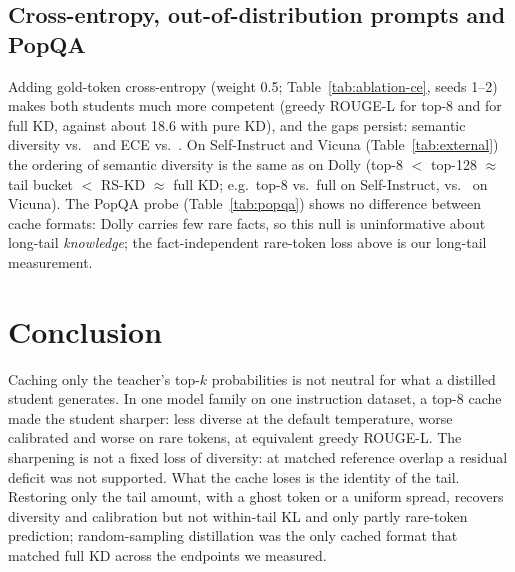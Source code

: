 \documentclass[11pt]{article}
\begin{document}
\subsection{Cross-entropy, out-of-distribution prompts and PopQA}
Adding gold-token cross-entropy (weight 0.5; Table~\ref{tab:ablation-ce}, seeds 1--2) makes both students much
more competent (greedy ROUGE-L \CETopEightRougeG{} for top-8 and \CEFullRougeG{} for full KD, against about 18.6 with
pure KD), and the gaps persist: semantic diversity \CETopEightSemDiv{} vs.\ \CEFullSemDiv{} and ECE \CETopEightECE{}
vs.\ \CEFullECE{}. On Self-Instruct and Vicuna (Table~\ref{tab:external}) the ordering of semantic diversity is the
same as on Dolly (top-8 $<$ top-128 $\approx$ tail bucket $<$ RS-KD $\approx$ full KD; e.g.\ top-8 \SITopEightSemDiv{}
vs.\ full \SIFullSemDiv{} on Self-Instruct, \VicTopEightSemDiv{} vs.\ \VicFullSemDiv{} on Vicuna). The PopQA probe
(Table~\ref{tab:popqa}) shows no difference between cache formats: Dolly carries few rare facts, so this null is
uninformative about long-tail \emph{knowledge}; the fact-independent rare-token loss above is our long-tail
measurement.

\section{Conclusion}
Caching only the teacher's top-$k$ probabilities is not neutral for what a distilled student generates. In one
model family on one instruction dataset, a top-8 cache made the student sharper: less diverse at the default
temperature, worse calibrated and worse on rare tokens, at equivalent greedy ROUGE-L. The sharpening is not a fixed
loss of diversity: at matched reference overlap a residual deficit was not supported. What the cache loses is the
identity of the tail. Restoring only the tail amount, with a ghost token or a uniform spread, recovers diversity and
calibration but not within-tail KL and only partly rare-token prediction; random-sampling distillation was the only
cached format that matched full KD across the endpoints we measured.

\end{document}
